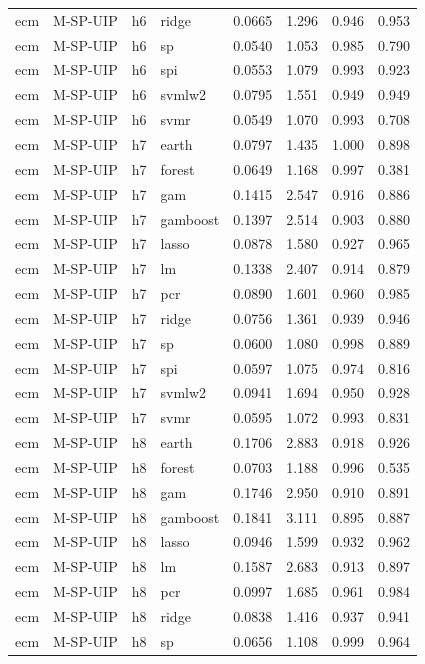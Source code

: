 \begin{ThreePartTable}
\begin{longtable}[t]{llclcccc}
ecm & M-SP-UIP & h6 & ridge & 0.0665 & 1.296 & 0.946 & 0.953\\
ecm & M-SP-UIP & h6 & sp & 0.0540 & 1.053 & 0.985 & 0.790\\
ecm & M-SP-UIP & h6 & spi & 0.0553 & 1.079 & 0.993 & 0.923\\
ecm & M-SP-UIP & h6 & svmlw2 & 0.0795 & 1.551 & 0.949 & 0.949\\
ecm & M-SP-UIP & h6 & svmr & 0.0549 & 1.070 & 0.993 & 0.708\\
\addlinespace
ecm & M-SP-UIP & h7 & earth & 0.0797 & 1.435 & 1.000 & 0.898\\
ecm & M-SP-UIP & h7 & forest & 0.0649 & 1.168 & 0.997 & 0.381\\
ecm & M-SP-UIP & h7 & gam & 0.1415 & 2.547 & 0.916 & 0.886\\
ecm & M-SP-UIP & h7 & gamboost & 0.1397 & 2.514 & 0.903 & 0.880\\
ecm & M-SP-UIP & h7 & lasso & 0.0878 & 1.580 & 0.927 & 0.965\\
ecm & M-SP-UIP & h7 & lm & 0.1338 & 2.407 & 0.914 & 0.879\\
ecm & M-SP-UIP & h7 & pcr & 0.0890 & 1.601 & 0.960 & 0.985\\
ecm & M-SP-UIP & h7 & ridge & 0.0756 & 1.361 & 0.939 & 0.946\\
ecm & M-SP-UIP & h7 & sp & 0.0600 & 1.080 & 0.998 & 0.889\\
ecm & M-SP-UIP & h7 & spi & 0.0597 & 1.075 & 0.974 & 0.816\\
ecm & M-SP-UIP & h7 & svmlw2 & 0.0941 & 1.694 & 0.950 & 0.928\\
ecm & M-SP-UIP & h7 & svmr & 0.0595 & 1.072 & 0.993 & 0.831\\
\addlinespace
ecm & M-SP-UIP & h8 & earth & 0.1706 & 2.883 & 0.918 & 0.926\\
ecm & M-SP-UIP & h8 & forest & 0.0703 & 1.188 & 0.996 & 0.535\\
ecm & M-SP-UIP & h8 & gam & 0.1746 & 2.950 & 0.910 & 0.891\\
ecm & M-SP-UIP & h8 & gamboost & 0.1841 & 3.111 & 0.895 & 0.887\\
ecm & M-SP-UIP & h8 & lasso & 0.0946 & 1.599 & 0.932 & 0.962\\
ecm & M-SP-UIP & h8 & lm & 0.1587 & 2.683 & 0.913 & 0.897\\
ecm & M-SP-UIP & h8 & pcr & 0.0997 & 1.685 & 0.961 & 0.984\\
ecm & M-SP-UIP & h8 & ridge & 0.0838 & 1.416 & 0.937 & 0.941\\
ecm & M-SP-UIP & h8 & sp & 0.0656 & 1.108 & 0.999 & 0.964\\

\end{longtable}
\end{ThreePartTable}
